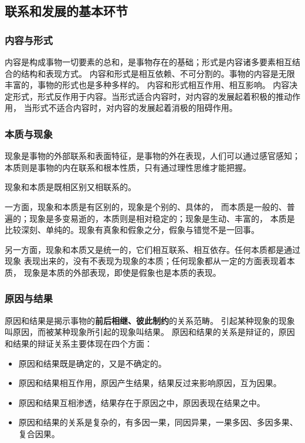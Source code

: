 \documentclass[10pt, UTF8]{book} %
\begin{document}
\subsection{联系和发展的基本环节}

\subsubsection{内容与形式}

内容是构成事物一切要素的总和，是事物存在的基础；形式是内容诸多要素相互结合的结构和表现方式。
内容和形式是相互依赖、不可分割的。事物的内容是无限丰富的，事物的形式也是多种多样的。
内容和形式相互作用、相互影响。
内容决定形式，形式反作用于内容。当形式适合内容时，对内容的发展起着积极的推动作用，
当形式不适合内容时，对内容的发展起着消极的阻碍作用。

\subsubsection{本质与现象}

现象是事物的外部联系和表面特征，是事物的外在表现，人们可以通过感官感知；
本质则是事物的内在联系和根本性质，只有通过理性思维才能把握。

现象和本质是既相区别又相联系的。

一方面，现象和本质是有区别的，现象是个别的、具体的，
而本质是一般的、普遍的；现象是多变易逝的，本质则是相对稳定的；现象是生动、丰富的，
本质是比较深刻、单纯的。现象有真象和假象之分，假象与错觉不是一回事。

另一方面，现象和本质又是统一的，它们相互联系、相互依存。任何本质都是通过现象
表现出来的，没有不表现为现象的本质；任何现象都从一定的方面表现着本质，
现象是本质的外部表现，即使是假象也是本质的表现。

\subsubsection{原因与结果}

原因和结果是揭示事物的\textbf{前后相继、彼此制约}的关系范畴。
引起某种现象的现象叫原因，而被某种现象所引起的现象叫结果。
原因和结果的关系是辩证的，原因和结果的辩证关系主要体现在四个方面：
\begin{itemize}[itemsep=0pt]
    \item 原因和结果既是确定的，又是不确定的。
    \item 原因和结果相互作用，原因产生结果，结果反过来影响原因，互为因果。
    \item 原因和结果互相渗透，结果存在于原因之中，原因表现在结果之中。
    \item 原因和结果的关系是复杂的，有多因一果，同因异果，一果多因、多因多果、
        复合因果。
\end{itemize}
\end{document}
